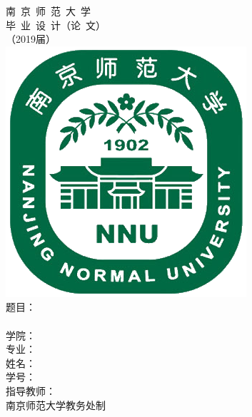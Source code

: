 \documentclass[a4paper]{ctexart}
\begin{document}
\pagestyle{empty}
\centering\vspace*{3ex}
	{\LARGE\lishu 南\ 京\ 师\ 范\ 大\ 学}\vspace{4ex}\\%
	{ \heiti 毕\  业\ 设\ 计（论\ 文）}\vspace{3ex}\\ %
	{\Huge\heiti （2019届）}\\\vspace{8ex}%
	\includegraphics[scale=.35]{Nanjing_Normal_University_logo}\vspace{8ex}\\ 
	{\Large
		{\heiti 题\phantom{题目}目：}\uline{}\medskip\\
		\hspace{2.6cm}\uline{}\medskip\\
		{\heiti 学\phantom{学院}院：}\uline{}\medskip\\
		{\heiti 专\phantom{专业}业：}\uline{}\medskip\\
		{\heiti 姓\phantom{姓名}名：}\uline{}\medskip\\
		{\heiti 学\phantom{学号}号：}\uline{}\medskip\\
		{\heiti 指导教师：}\uline{}\\\vspace{8ex}
		{\heiti 南京师范大学教务处\phantom{空}制}
	}
\end{document}
